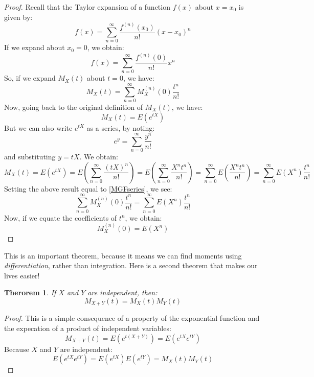 \documentclass[12pt]{article} %
\newtheorem{thm}{Therorem}
\begin{document}
\begin{proof}
Recall that the Taylor expansion of a function $f(x)$ about $x=x_0$ is given by:
$$f(x) = \sum_{n=0}^\infty \frac{f^{(n)}(x_0)}{n!} \left(x-x_0\right)^n$$
If we expand about $x_0 = 0$, we obtain:
$$f(x) = \sum_{n=0}^\infty \frac{f^{(n)}(0)}{n!}x^n$$
So, if we expand $M_X(t)$ about $t=0$, we have:
\begin{equation}\label{MGFseries} M_X(t) = \sum_{n=0}^\infty M_X^{(n)}(0) \frac{t^n}{n!} \end{equation}
Now, going back to the original definition of $M_X(t)$, we have:
$$M_X(t) = E(e^{tX})$$
But we can also write $e^{tX}$ as a series, by noting:
$$e^y = \sum_{n=0}^\infty \frac{y^n}{n!}$$
and substituting $y=tX$. We obtain:
$$M_X(t) = E(e^{tX}) = E\left(\sum_{n=0}^\infty \frac{(tX)^n}{n!}\right) = E\left(\sum_{n=0}^\infty \frac{X^nt^n}{n!}\right) = \sum_{n=0}^\infty E\left(\frac{X^nt^n}{n!}\right) =  \sum_{n=0}^\infty E\left(X^n\right)\frac{t^n}{n!}$$
Setting the above result equal to \eqref{MGFseries}, we see:
$$\sum_{n=0}^\infty M_X^{(n)}(0) \frac{t^n}{n!} = \sum_{n=0}^\infty E\left(X^n\right)\frac{t^n}{n!}$$
Now, if we equate the coefficients of $t^n$, we obtain:
$$M_X^{(n)}(0) = E(X^n)$$
\end{proof}

This is an important theorem, because it means we can find moments using \emph{differentiation}, rather than integration. Here is a second theorem that makes our lives easier!

\begin{thm}
If $X$ and $Y$ are independent, then:
$$M_{X+Y}(t) = M_X(t)M_Y(t)$$
\end{thm}
\begin{proof}
This is a simple consequence of a property of the exponential function and the expecation of a product of independent variables:
$$M_{X+Y}(t) = E\left(e^{t(X+Y)}\right) = E\left(e^{tX}e^{tY}\right)$$
Because $X$ and $Y$ are independent:
$$E\left(e^{tX}e^{tY}\right) = E\left(e^{tX}\right)E\left(e^{tY}\right) = M_X(t)M_Y(t)$$
\end{proof}
\end{document}
